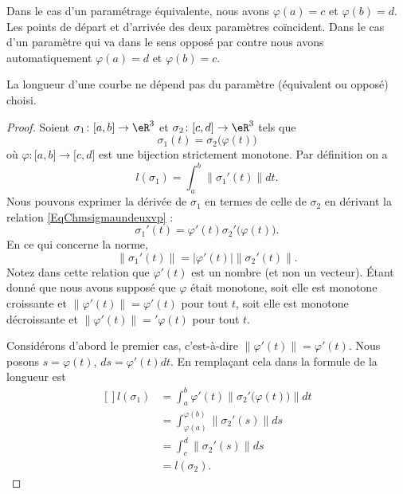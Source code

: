 Dans le cas d'un paramétrage équivalente, nous avons \( \varphi(a)=c\) et \( \varphi(b)=d\). Les points de départ et d'arrivée des deux paramètres coïncident. Dans le cas d'un paramètre qui va dans le sens opposé par contre nous avons automatiquement \( \varphi(a)=d\) et \( \varphi(b)=c\).

\begin{proposition}
	La longueur d'une courbe ne dépend pas du paramètre (équivalent ou opposé) choisi.
\end{proposition}

\begin{proof}
	Soient \( \sigma_1\colon \mathopen[ a , b \mathclose]\to \eR^3\) et \( \sigma_2\colon \mathopen[ c , d \mathclose]\to \eR^3\) tels que
	\begin{equation}     \label{EqChmsigmaundeuxvp}
		\sigma_1(t)=\sigma_2\big( \varphi(t) \big)
	\end{equation}
	où \( \varphi\colon \mathopen[ a , b \mathclose]\to \mathopen[ c , d \mathclose]\) est une bijection strictement monotone. Par définition on a
	\begin{equation}
		l(\sigma_1)=\int_a^b\| \sigma_1'(t) \|dt.
	\end{equation}
	Nous pouvons exprimer la dérivée de \( \sigma_1\) en termes de celle de \( \sigma_2\) en dérivant la relation \eqref{EqChmsigmaundeuxvp} :
	\begin{equation}
		\sigma_1'(t)=\varphi'(t)\sigma_2'\big( \varphi(t) \big).
	\end{equation}
	En ce qui concerne la norme,
	\begin{equation}
		\| \sigma_1'(t) \|=| \varphi'(t) |\| \sigma_2'(t) \|.
	\end{equation}
	Notez dans cette relation que \( \varphi'(t)\) est un nombre (et non un vecteur). Étant donné que nous avons supposé que \( \varphi\) était monotone, soit elle est monotone croissante et \( \| \varphi'(t) \|=\varphi'(t)\) pour tout \( t\), soit elle est monotone décroissante et \( \| \varphi'(t) \|='\varphi(t)\) pour tout \( t\).

	Considérons d'abord le premier cas, c'est-à-dire \( \| \varphi'(t) \|=\varphi'(t)\). Nous posons \( s=\varphi(t)\), \( ds=\varphi'(t)dt\). En remplaçant cela dans la formule de la longueur est
	\begin{equation}
		\begin{aligned}[]
			l(\sigma_1) & =\int_a^b\varphi'(t)\| \sigma_2'\big( \varphi(t) \big) \|dt \\
			            & =\int_{\varphi(a)}^{\varphi(b)}\| \sigma_2'(s) \|ds         \\
			            & =\int_c^d\| \sigma_2'(s) \|ds                               \\
			            & =l(\sigma_2).
		\end{aligned}
	\end{equation}


\end{proof}
